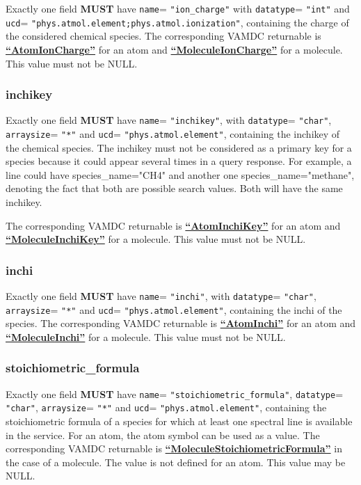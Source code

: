 \documentclass[11pt,a4paper]{ivoa}
\def\attrval#1#2{\texttt{#1}\discretionary{}{}{}=\discretionary{}{}{}%
  \texttt{"#2"}}
\def\vamdcret#1{\href{https://dictionary.vamdc.eu/returnables/\##1}{\textbf{``\color{vamdccolor}#1''}}}
\begin{document}
Exactly one field \textbf{MUST} have \attrval{name}{ion\_charge} with \attrval{datatype}{int} and \attrval{ucd}{phys.atmol.element;phys.atmol.ionization},
containing the charge of  the considered chemical species. The corresponding VAMDC returnable is \vamdcret{AtomIonCharge}
for an atom and  \vamdcret{MoleculeIonCharge} for a molecule. This value must not be NULL.

\subsubsection{inchikey}

Exactly one field \textbf{MUST} have \attrval{name}{inchikey}, with
\attrval{datatype}{char}, \attrval{arraysize}{*} and \attrval{ucd}{phys.atmol.element}, containing the inchikey
of the chemical species. The inchikey must not be considered as a primary key for a species because it could appear
several times in a query response. For example, a line could have species\_name="CH4" and another one species\_name="methane",
denoting the fact that both are possible search values. Both will have the same inchikey.

The corresponding VAMDC returnable is \vamdcret{AtomInchiKey} for an atom and \vamdcret{MoleculeInchiKey} for a molecule.
This value must not be NULL.

\subsubsection{inchi}

Exactly one field \textbf{MUST} have \attrval{name}{inchi}, with \attrval{datatype}{char}, \attrval{arraysize}{*}
and \attrval{ucd}{phys.atmol.element}, containing the inchi of the species. The corresponding VAMDC returnable
is \vamdcret{AtomInchi} for an atom and \vamdcret{MoleculeInchi} for a molecule. This value must not be NULL.

\subsubsection{stoichiometric\_formula}

Exactly one field \textbf{MUST} have
\attrval{name}{stoichiometric\_formula}, \attrval{datatype}{char},
\attrval{arraysize}{*} and
\attrval{ucd}{phys.atmol.element}, containing the stoichiometric formula of a species for which at least one spectral line
is available in the service. For an atom, the atom symbol can be used as a value.
The corresponding VAMDC returnable is \vamdcret{MoleculeStoichiometricFormula} in the case of a molecule.
The value is not defined for an atom. This value may be NULL.
\end{document}
